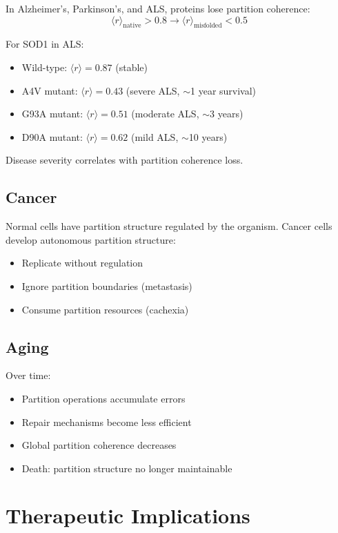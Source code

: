 ﻿\documentclass[twocolumn,10pt,a4paper]{article}
\theoremstyle{definition}
\theoremstyle{remark}
\newcommand{\Order}{\langle r \rangle}
\begin{document}
In Alzheimer's, Parkinson's, and ALS, proteins lose partition coherence:
\begin{equation}
    \Order_{\mathrm{native}} > 0.8 \to \Order_{\mathrm{misfolded}} < 0.5
\end{equation}

For SOD1 in ALS:
\begin{itemize}
    \item Wild-type: $\Order = 0.87$ (stable)
    \item A4V mutant: $\Order = 0.43$ (severe ALS, $\sim$1 year survival)
    \item G93A mutant: $\Order = 0.51$ (moderate ALS, $\sim$3 years)
    \item D90A mutant: $\Order = 0.62$ (mild ALS, $\sim$10 years)
\end{itemize}

Disease severity correlates with partition coherence loss.

\subsection{Cancer}

Normal cells have partition structure regulated by the organism. Cancer cells develop autonomous partition structure:
\begin{itemize}
    \item Replicate without regulation
    \item Ignore partition boundaries (metastasis)
    \item Consume partition resources (cachexia)
\end{itemize}

\subsection{Aging}

Over time:
\begin{itemize}
    \item Partition operations accumulate errors
    \item Repair mechanisms become less efficient
    \item Global partition coherence decreases
    \item Death: partition structure no longer maintainable
\end{itemize}

\section{Therapeutic Implications}
\label{sec:therapy}
\end{document}
